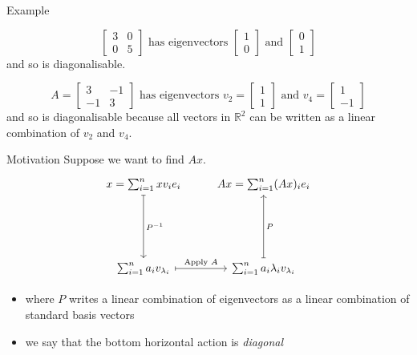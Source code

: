 \documentclass{beamer}
\begin{document}
\begin{frame}{Example}
\begin{example}
	\begin{equation*}
	\left[
	\begin{matrix}
	3&0\\
	0&5
	\end{matrix}
	\right]
	\text{ has eigenvectors }
	\left[
	\begin{matrix}
	1\\
	0
	\end{matrix}
	\right]\text{ and }
	\left[
	\begin{matrix}
	0\\
	1
	\end{matrix}
	\right]
	\end{equation*}
	and so is diagonalisable.
\end{example}
\begin{example}
	\begin{equation*}
		A = \left[\begin{matrix}
			3 & -1\\
			-1 & 3
		\end{matrix}\right]
	\text{ has eigenvectors }
	v_2 = \left[
	\begin{matrix}
	1\\
	1
	\end{matrix}
	\right]\text{ and }
	v_4 = \left[
	\begin{matrix}
	1\\
	-1
	\end{matrix}
	\right]
	\end{equation*}
	and so is diagonalisable because all vectors in $\mathbb{R}^2$ can be written as a linear combination of $v_2$ and $v_4$.
\end{example}
\end{frame}

\begin{frame}[fragile]{Motivation}
Suppose we want to find $Ax$.
{\LARGE
\begin{equation*}
\begin{tikzcd}[row sep = 2cm]
x = \sum_{i=1}^n xv_i e_i \dar[mapsto]{P^{-1}} & Ax = \sum_{i=1}^n (Ax)_i e_i\\
\sum_{i=1}^n a_i v_{\lambda_i} \rar[mapsto]{\text{Apply }A} & \sum_{i=1}^n a_i\lambda_i v_{\lambda_i} \uar[mapsto][swap]{P}
\end{tikzcd}
\end{equation*}
}
\begin{itemize}
	\item where $P$ writes a linear combination of eigenvectors as a linear combination of standard basis vectors
	\item we say that the bottom horizontal action is \emph{diagonal}
\end{itemize}
\end{frame}
\end{document}
